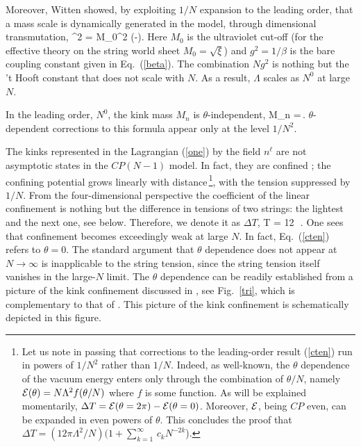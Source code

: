 Moreover, Witten showed, by exploiting  $1/N$ 
expansion to the leading order, 
that a mass scale is dynamically generated in the model,
through dimensional transmutation,
\beq 
\Lambda^2 = M_0^2 \exp\left(-\right).
\label{scp}
\eeq
Here $M_0$ is the ultraviolet cut-off 
(for the effective theory on the string world sheet
$M_0=\sqrt{\xi}$) and $g^2=1/\beta$ is the bare
coupling constant given in Eq.~(\ref{beta}). 
The combination $Ng^2$ is nothing but
the 't Hooft constant that does not scale with $N$. 
As a result, $\Lambda$ scales as $N^0$  at large $N$.

In the leading  order, $N^0$, the kink mass $M_{n}$ is 
$\theta$-independent,
\beq
M_{n} =\Lambda\,.
\eeq
$\theta$-dependent corrections to this formula appear only at the
level $1/N^2$. 

The kinks represented in the Lagrangian (\ref{one}) by the field $n^{\ell}$
are not asymptotic states in the $CP(N-1)$ model. In fact, 
they are confined \cite{5};
the confining potential grows linearly with distance\,\footnote{Let us note 
in passing that corrections to the leading-order result (\ref{cten}) run in 
powers of $1/N^2$ rather than $1/N$.
Indeed, as well-known, the $\theta$ dependence of the vacuum energy enters
 only through
the combination of $\theta /N$, namely ${\cal E}( \theta )  = N\Lambda^2
f( \theta /N )$ where $f $ is some function. As will be explained 
momentarily, $\Delta T = {\cal E}( \theta = 2\pi)-{\cal E}( \theta =0)$.
Moreover, ${\cal E}$, being $CP$ even, can be expanded in even powers of
$\theta$. This concludes the proof that 
$\Delta T = (12\pi\Lambda^2/N)(1 +\sum_{k=1}^\infty \, c_kN^{-2k}$).}, 
with the tension suppressed by $1/N$. From the four-dimensional 
perspective the coefficient of the linear confinement is nothing
but the difference in tensions of two  strings:
the lightest and the next one, see below.  Therefore,  we denote it 
as $\Delta T$,
\beq
\Delta T = 12\pi\, \,.
\label{cten}
\eeq
One sees that confinement  becomes
exceedingly weak at large $N$. In fact, Eq.~(\ref{cten})
refers to $\theta =0$. The standard argument that
$\theta $ dependence does not appear
at $N\to\infty$ is inapplicable to the string tension,
since the string tension itself vanishes in the large-$N$ limit.
The $\theta $ dependence can be readily established from 
a picture of the kink confinement discussed in
\cite{Markov}, see Fig.~\ref{tri},  which is complementary to that
of \cite{5}. This picture of the kink confinement is schematically 
depicted in this
figure.

